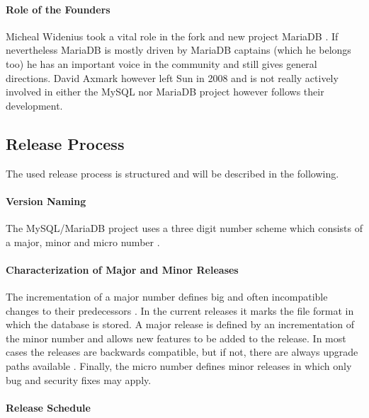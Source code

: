 \paragraph{Role of the Founders}

Micheal Widenius took a vital role in the fork and new project MariaDB
\cite{MySQLBehind,MySQLAbout}. If nevertheless MariaDB is mostly driven by
MariaDB captains (which he belongs too) he has an important voice in the
community and still gives general directions. David Axmark however left Sun in
2008 and is not really actively involved in either the MySQL nor MariaDB
project however follows their development.

\subsection{Release Process}

The used release process is structured and will be described in the following.

\paragraph{Version Naming}

The MySQL/MariaDB project uses a three digit number scheme which consists of a
major, minor and micro number \cite{MySQLVersion}.

\paragraph{Characterization of Major and Minor Releases}

The incrementation of a major number defines big and often incompatible changes
to their predecessors \cite{MySQLVersion}. In the current releases it marks the
file format in which the database is stored. A major release is defined by an
incrementation of the minor number and allows new features to be added to the
release. In most cases the releases are backwards compatible, but if not, there
are always upgrade paths available \cite{MySQLMariaDB5.1}. Finally, the micro
number defines minor releases in which only bug and security fixes may apply.

\paragraph{Release Schedule}


